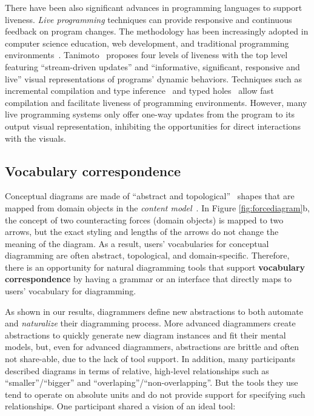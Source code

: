 There have been also significant advances in programming languages to support liveness. \emph{Live programming} techniques can provide responsive and continuous feedback on program changes. The methodology has been increasingly adopted in computer science education, web development, and traditional programming environments~\cite{mcdirmid_living_2007, wysiwyc, SEEDE}. Tanimoto~\cite{Viva-Liveness} proposes four levels of liveness with the top level featuring ``stream-driven updates'' and ``informative, significant, responsive and live'' visual representations of programs' dynamic behaviors. Techniques such as incremental compilation and type inference~\cite{mcdirmid_superglue_2006} and typed holes~\cite{typedHoles} allow fast compilation and facilitate liveness of programming environments. However, many live programming systems only offer one-way updates from the program to its output visual representation, inhibiting the opportunities for direct interactions with the visuals.

\subsection{Vocabulary correspondence}

Conceptual diagrams are made of ``abstract and topological''~\cite{designingWithDiagrams} shapes that are mapped from domain objects in the \emph{content model}~\cite{fundamentalDesignVars}. In Figure \ref{fig:forcediagram}b, the concept of two counteracting forces (domain objects) is mapped to two arrows, but the exact styling and lengths of the arrows do not change the meaning of the diagram. As a result, users' vocabularies for conceptual diagramming are often abstract, topological, and domain-specific. Therefore, there is an opportunity for natural diagramming tools that support \textbf{vocabulary correspondence} by having a grammar or an interface that directly maps to users' vocabulary for diagramming. 

As shown in our results, diagrammers define new abstractions to both automate and \emph{naturalize} their diagramming process. More advanced diagrammers create abstractions to quickly generate new diagram instances and fit their mental models, but, even for advanced diagrammers, abstractions are brittle and often not share-able, due to the lack of tool support. In addition, many participants described diagrams in terms of relative, high-level relationships such as ``smaller''/``bigger'' and ``overlaping''/``non-overlapping''. But the tools they use tend to operate on absolute units and do not provide support for specifying such relationships. One participant shared a vision of an ideal tool:

